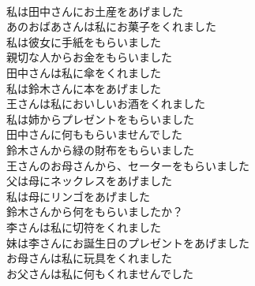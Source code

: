 \documentclass[8pt]{extreport}
\begin{document}
\begin{CJK}{UTF8}{min}
\\	私は田中さんにお土産をあげました	
\\	あのおばあさんは私にお菓子をくれました	
\\	私は彼女に手紙をもらいました	
\\	親切な人からお金をもらいました	
\\	田中さんは私に傘をくれました	
\\	私は鈴木さんに本をあげました	
\\	王さんは私においしいお酒をくれました	
\\	私は姉からプレゼントをもらいました	
\\	田中さんに何ももらいませんでした	
\\	鈴木さんから緑の財布をもらいました	
\\	王さんのお母さんから、セーターをもらいました	
\\	父は母にネックレスをあげました	
\\	私は母にリンゴをあげました	
\\	鈴木さんから何をもらいましたか？	
\\	李さんは私に切符をくれました	
\\	妹は李さんにお誕生日のプレゼントをあげました	
\\	お母さんは私に玩具をくれました	
\\	お父さんは私に何もくれませんでした	
\end{CJK}
\end{document}
